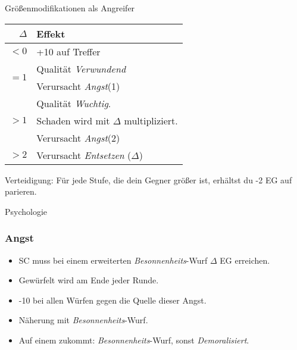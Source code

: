 \documentclass{article}
\begin{document}
\pagebreak

\begin{multicols*}{3}
    
    \begin{slsframe}{Größenmodifikationen als Angreifer}
        \begin{tabularx}{\linewidth}{rX}
            \textbf{$\Delta$}       & \textbf{Effekt} \\ \hline
            $<0$                    & +10 auf Treffer \\ \hline
            \multirow{2}{*}{$=1$}   & Qualität \textit{Verwundend} \\ 
                                    & Verursacht \textit{Angst}(1) \\ \hline
            \multirow{3}{*}{$>1$}   & Qualität \textit{Wuchtig}. \\
                                    & Schaden wird mit $\Delta$ multipliziert.  \\
                                    & Verursacht \textit{Angst}(2) \\ \hline
            $>2$                    & Verursacht \textit{Entsetzen} ($\Delta$)
        \end{tabularx}
        
        \vspace{0.5em}
        
        Verteidigung: Für jede Stufe, die dein Gegner größer ist, erhältst du -2 EG auf parieren.

    \end{slsframe}

    \begin{slsframe}{Psychologie}

        \subsubsection*{Angst}
        \begin{itemize}
            \setlength\itemsep{0.1em}
            \item SC muss bei einem erweiterten \textit{Besonnenheits}-Wurf $\Delta$ EG erreichen.
            \item Gewürfelt wird am Ende jeder Runde.
            \item -10 bei allen Würfen gegen die Quelle dieser Angst.
            \item Näherung mit \textit{Besonnenheits}-Wurf.
            \item Auf einem zukommt: \textit{Besonnenheits}-Wurf, sonst \textit{Demoralisiert}.  
        \end{itemize}
        

\end{slsframe}
\end{multicols*}
\end{document}
